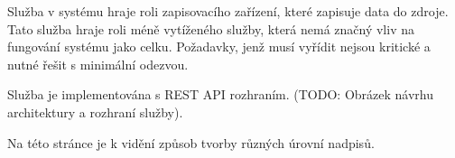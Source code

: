 
Služba v systému hraje roli zapisovacího zařízení, které zapisuje data do zdroje. Tato služba hraje roli méně vytíženého služby, která nemá značný vliv na fungování systému jako celku. Požadavky, jenž musí vyřídit nejsou kritické a nutné řešit s minimální odezvou.

Služba je implementována s REST API rozhraním. (TODO: Obrázek návrhu architektury a rozhraní služby).















Na této stránce je k vidění způsob tvorby různých úrovní nadpisů.












